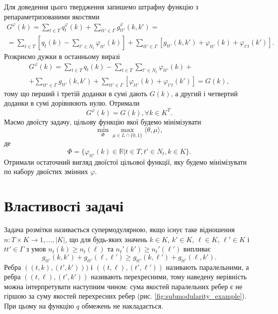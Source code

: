 Для доведення цього твердження запишемо штрафну функцію з репараметризованими
якостями
\begin{gather*}
  G^{\varphi}(k) =  \sum\limits_{t\in T} q^{\varphi}_t(k)+
  \sum\limits_{tt'\in \Gamma} g^{\varphi}_{tt'}(k,k')=\\
  =\sum\limits_{t\in T}  \left[ q_t(k)- \sum\limits_{t'\in N_t} \varphi_{tt'}(k) \right]
  +\sum\limits_{tt'\in \Gamma} \left[g_{tt'}(k,k') + \varphi_{tt'}(k) + \varphi_{t't}(k') \right].
\end{gather*}
Розкриємо дужки в останньому виразі
\begin{gather*}
  G^{\varphi}(k) =  \sum\limits_{t\in T} q_t(k)-\sum\limits_{t\in T}\sum\limits_{t'\in N_t}\varphi_{tt'}(k)+\\
  +\sum\limits_{tt'\in \Gamma}g_{tt'}(k,k')+\sum\limits_{tt'\in \Gamma}\left[ \varphi_{tt'}(k) + \varphi_{t't}(k')\right]=G(k),
\end{gather*}
тому що перший і третій доданки в сумі дають $G(k)$, а другий і четвертий доданки в сумі дорівнюють нулю.
Отримали
\begin{equation*}
  G^{\varphi}(k) = G(k), \forall k\in K^T.
\end{equation*}
Маємо двоїсту задачу, цільову функцію якої будемо мінімізувати
\begin{equation*}
  \min_{\Phi}\max_{\mu\in L\cap \{0,1\}}\langle\theta,\mu\rangle,
\end{equation*}
де
\begin{equation*}
  \Phi = \{\varphi_{tt'}(k)\in\mathbb{R}|t\in T, t'\in N_t, k\in K\}.
\end{equation*}
Отримали остаточний вигляд двоїстої цільової функції, яку будемо мінімізувати
по набору двоїстих змінних $\varphi$.

\section{Властивості задачі}

Задача розмітки називається супермодулярною, якщо існує таке відношення
$n:T\times K\rightarrow {1,\dots, \left\lvert K\right\rvert } $,
що для будь-яких значень $k\in K$, $k'\in K$, $\ell \in K$, $\ell'\in K$ і $tt'\in \Gamma$ з умов
$n_t(k)\geq n_t(\ell)$ та $n_t'(k')\geq n_t'(\ell')$ випливає
\begin{equation*}
    g_{tt'}(k,k') + g_{tt'}(\ell,\ell')\geq g_{tt'}(k,\ell') + g_{tt'}(\ell,k').
   \end{equation*}
Ребра $((t,k),(t',k')))$ і $((t,\ell),(t',\ell'))$ називають паралельними,
а ребра $((t,\ell),(t',k'))$ називають перехресними, тому наведену нерівність
можна інтерпретувати наступним чином: сума якостей паралельних ребер є не гіршою
за суму якостей перехресних ребер (рис. \ref{fig:submodularity_example}). При цьому на функцію $q$ обмежень не накладається.

